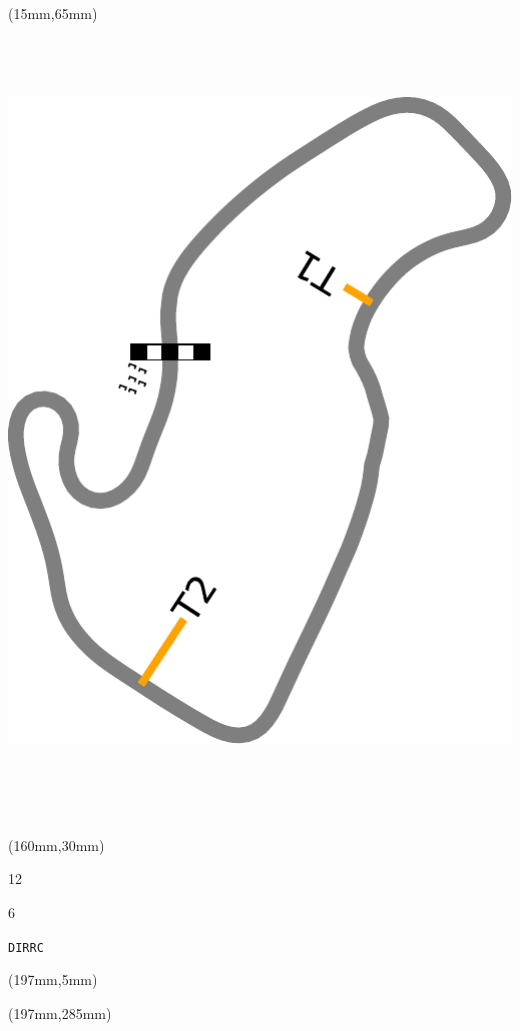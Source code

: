 \begin{textblock*}{185mm}(15mm,65mm)%
\centering
\mbox{\includegraphics[width=185mm,height=210mm,keepaspectratio]{PT/DIRRC.pdf}}
\end{textblock*}
\begin{textblock*}{40mm}(160mm,30mm)%
\Large
\par{} 
\par12 
\par6 
\par\hfill\tiny\tt DIRRC\\
\end{textblock*}
\begin{textblock*}{20mm}(197mm,5mm)%
\fbox{\thepage}
\label{DIRRC}
\end{textblock*}
\begin{textblock*}{20mm}(197mm,285mm)%
\fbox{\thepage}
\end{textblock*}

